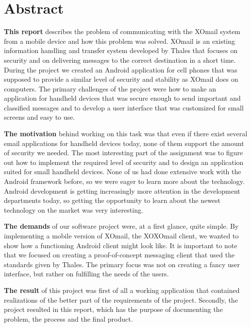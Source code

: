 
\chapter*{Abstract}

\textbf{This report} describes the problem of communicating with the XOmail system from a mobile device and how this problem was solved. XOmail is an existing information handling and transfer system developed by Thales that focuses on security and on delivering messages to the correct destination in a short time. During the project we created an Android application for cell phones that was supposed to provide a similar level of security and stability as XOmail does on computers. The primary challenges of the project were how to make an application for handheld devices that was secure enough to send important and classified messages and to develop a user interface that was customized for small screens and easy to use.
\newline

\textbf{The motivation} behind working on this task was that even if there exist several email applications for handheld devices today, none of them support the amount of security we needed. The most interesting part of the assignment was to figure out how to implement the required level of security and to design an application suited for small handheld devices. None of us had done extensive work with the Android framework before, so we were eager to learn more about the technology. Android development is getting increasingly more attention in the development departments today, so getting the opportunity to learn about the newest technology on the market was very interesting.
\newline

\textbf{The demands} of our software project were, at a first glance, quite simple. By implementing a mobile version of XOmail, the XOXOmail client, we wanted to show how a functioning Android client might look like. It is important to note that we focused on creating a proof-of-concept messaging client that used the standards given by Thales. The primary focus was not on creating a fancy user interface, but rather on fulfilling the needs of the users.
\newline

\textbf{The result} of this project was first of all a working application that contained realizations of the better part of the requirements of the project. Secondly, the project resulted in this report, which has the purpose of documenting the problem, the process and the final product.